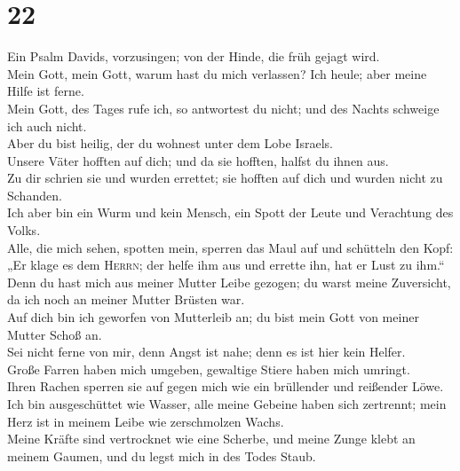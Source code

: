 \hypertarget{section-21}{%
\section{22}\label{section-21}}

 Ein Psalm Davids, vorzusingen; von der Hinde, die früh
gejagt wird.\\
 Mein Gott, mein Gott, warum hast du mich verlassen? Ich
heule; aber meine Hilfe ist ferne.\\
 Mein Gott, des Tages rufe ich, so antwortest du nicht;
und des Nachts schweige ich auch nicht.\\
 Aber du bist heilig, der du wohnest unter dem Lobe
Israels.\\
 Unsere Väter hofften auf dich; und da sie hofften, halfst
du ihnen aus.\\
 Zu dir schrien sie und wurden errettet; sie hofften auf
dich und wurden nicht zu Schanden.\\
 Ich aber bin ein Wurm und kein Mensch, ein Spott der
Leute und Verachtung des Volks.\\
 Alle, die mich sehen, spotten mein, sperren das Maul auf
und schütteln den Kopf:\\
 „Er klage es dem \textsc{Herrn}; der helfe ihm aus und
errette ihn, hat er Lust zu ihm.``\\
 Denn du hast mich aus meiner Mutter Leibe gezogen; du
warst meine Zuversicht, da ich noch an meiner Mutter Brüsten war.\\
 Auf dich bin ich geworfen von Mutterleib an; du bist
mein Gott von meiner Mutter Schoß an.\\
 Sei nicht ferne von mir, denn Angst ist nahe; denn es
ist hier kein Helfer.\\
 Große Farren haben mich umgeben, gewaltige Stiere haben
mich umringt.\\
 Ihren Rachen sperren sie auf gegen mich wie ein
brüllender und reißender Löwe.\\
 Ich bin ausgeschüttet wie Wasser, alle meine Gebeine
haben sich zertrennt; mein Herz ist in meinem Leibe wie zerschmolzen
Wachs.\\
 Meine Kräfte sind vertrocknet wie eine Scherbe, und
meine Zunge klebt an meinem Gaumen, und du legst mich in des Todes
Staub.\\
